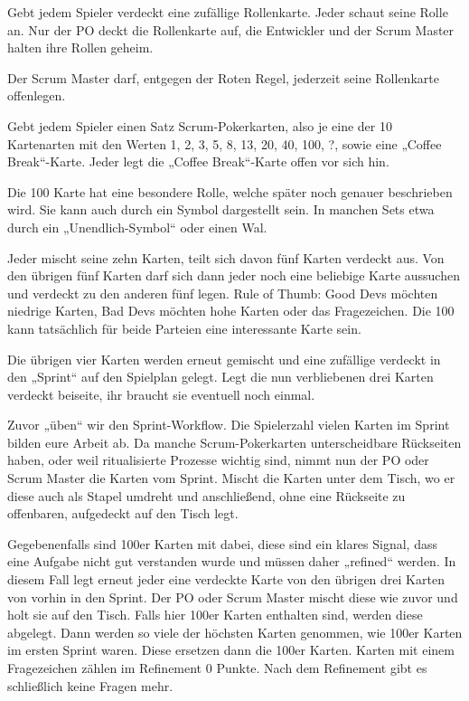 \documentclass[10pt,a4paper]{article}
\begin{document}
Gebt jedem Spieler verdeckt eine zufällige Rollenkarte. Jeder schaut seine Rolle an. Nur der PO deckt die Rollenkarte auf, die Entwickler und der Scrum Master halten ihre Rollen geheim.

Der Scrum Master darf, entgegen der Roten Regel, jederzeit seine Rollenkarte offenlegen.

Gebt jedem Spieler einen Satz Scrum-Pokerkarten, also je eine der 10 Kartenarten mit den Werten 1, 2, 3, 5, 8, 13, 20, 40, 100, ?, sowie eine „Coffee Break“-Karte. Jeder legt die „Coffee Break“-Karte offen vor sich hin.

Die 100 Karte hat eine besondere Rolle, welche später noch genauer beschrieben wird. Sie kann auch durch ein Symbol dargestellt sein. In manchen Sets etwa durch ein „Unendlich-Symbol“ oder einen Wal.

Jeder mischt seine zehn Karten, teilt sich davon fünf Karten verdeckt aus. Von den übrigen fünf Karten darf sich dann jeder noch eine beliebige Karte aussuchen und verdeckt zu den anderen fünf legen. Rule of Thumb: Good Devs möchten niedrige Karten, Bad Devs möchten hohe Karten oder das Fragezeichen. Die 100 kann tatsächlich für beide Parteien eine interessante Karte sein.

Die übrigen vier Karten werden erneut gemischt und eine zufällige verdeckt in den „Sprint“ auf den Spielplan gelegt. Legt die nun verbliebenen drei Karten verdeckt beiseite, ihr braucht sie eventuell noch einmal.

Zuvor „üben“ wir den Sprint-Workflow. Die Spielerzahl vielen Karten im Sprint bilden eure Arbeit ab. Da manche Scrum-Pokerkarten unterscheidbare Rückseiten haben, oder weil ritualisierte Prozesse wichtig sind, nimmt nun der PO oder Scrum Master die Karten vom Sprint. Mischt die Karten unter dem Tisch, wo er diese auch als Stapel umdreht und anschließend, ohne eine Rückseite zu offenbaren, aufgedeckt auf den Tisch legt.

Gegebenenfalls sind 100er Karten mit dabei, diese sind ein klares Signal, dass eine Aufgabe nicht gut verstanden wurde und müssen daher „refined“ werden. In diesem Fall legt erneut jeder eine verdeckte Karte von den übrigen drei Karten von vorhin in den Sprint. Der PO oder Scrum Master mischt diese wie zuvor und holt sie auf den Tisch. Falls hier 100er Karten enthalten sind, werden diese abgelegt. Dann werden so viele der höchsten Karten genommen, wie 100er Karten im ersten Sprint waren. Diese ersetzen dann die 100er Karten. Karten mit einem Fragezeichen zählen im Refinement 0 Punkte. Nach dem Refinement gibt es schließlich keine Fragen mehr.
\end{document}
